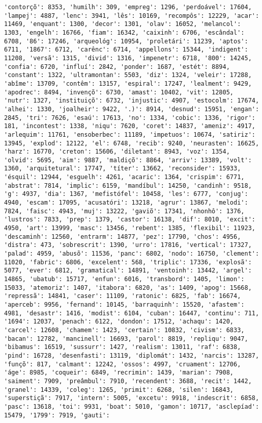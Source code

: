 \begin{Verbatim}[commandchars=\\\{\}]
'contorçõ': 8353, 'humilh': 309, 'empreg': 1296, 'perdoável': 17604, 'lampej': 4887, 'lenc': 3941, 'lês': 10169, 'recompôs': 12229, 'acar': 11469, 'enquant': 1300, 'decor': 1301, 'olav': 16052, 'melancol': 1303, 'engelh': 16766, 'fiam': 16342, 'caixinh': 6706, 'escândal': 6708, '86': 17246, 'arqueológ': 10954, 'proletári': 11239, 'aptos': 6711, '1867': 6712, 'carênc': 6714, 'appellons': 15344, 'indigent': 11208, 'versã': 1315, 'divid': 1316, 'impenetr': 6718, '800': 14245, 'confia': 6720, 'influí': 2842, 'ponder': 1687, 'estét': 8894, 'constant': 1322, 'ultramontan': 5503, 'diz': 1324, 'veleir': 17288, 'abîme': 13709, 'contêm': 13157, 'espiral': 17247, 'lealment': 9429, 'apodrec': 8494, 'invençõ': 6730, 'amast': 10402, 'vit': 12805, 'nutr': 1327, 'instituiçõ': 6732, 'injustic': 4907, 'estocolm': 17674, 'alhei': 1330, 'joalheir': 9422, '.)': 8914, 'desnud': 15951, 'engan': 2845, 'tri': 7626, 'esaú': 17613, 'no': 1334, 'cobic': 1336, 'rigor': 181, 'incontest': 1338, 'niqu': 7620, 'coret': 14837, 'ameniz': 4917, 'arlequim': 11761, 'ensoberbec': 11189, 'impetuos': 10674, 'satiriz': 13945, 'explod': 12122, 'el': 6748, 'recib': 9240, 'neurasten': 16625, 'harz': 16770, 'creton': 15606, 'diletant': 8943, 'voz': 1354, 'olvid': 5695, 'aim': 9887, 'maldiçõ': 8864, 'arriv': 13389, 'volt': 1360, 'arquitetural': 17747, 'títer': 13662, 'reconsider': 15933, 'ésquil': 12944, 'esguelh': 4261, 'acaric': 1364, 'crispim': 6771, 'abstrat': 7814, 'implic': 6159, 'mandíbul': 14250, 'candinh': 9518, 'g': 4937, 'dia': 1367, 'mefistófel': 10458, 'les': 6777, 'conjug': 4940, 'escam': 17095, 'acusatóri': 13218, 'agrur': 13867, 'melodi': 7824, 'faisc': 4943, 'muj': 13222, 'gaviõ': 17341, 'nhonhô': 1376, 'lustros': 7833, 'prep': 1379, 'castor': 16138, 'dif': 8010, 'excit': 4950, 'art': 13999, 'masc': 13456, 'rebent': 1385, 'flexibil': 11923, 'descaminh': 12560, 'entrarm': 14877, 'pez': 17790, 'chos': 4956, 'distra': 473, 'sobrescrit': 1390, 'urro': 17816, 'vertical': 17327, 'palad': 4959, 'abusõ': 11536, 'panc': 6802, 'nodo': 16750, 'clement': 11020, 'fabric': 6806, 'excelent': 568, 'triplic': 17336, 'explosã': 5077, 'ever': 6812, 'gramatical': 14891, 'ventoinh': 13442, 'argel': 14865, 'ubatub': 15717, 'enfun': 6016, 'transbord': 1405, 'limon': 15033, 'atemoriz': 1407, 'itabora': 6820, 'as': 1409, 'apog': 15668, 'repressã': 14841, 'caser': 11109, 'ratonic': 6825, 'fab': 16674, 'aperceb': 9956, 'fernand': 10145, 'barraquinh': 15520, 'afastem': 4981, 'desastr': 1416, 'modist': 6104, 'cuban': 16447, 'continu': 711, '1694': 12037, 'penach': 6122, 'dondon': 17512, 'achaqu': 1420, 'carcel': 12608, 'chamem': 1423, 'certain': 10832, 'civism': 6833, 'bacan': 12782, 'mancinell': 16693, 'parol': 8819, 'repliqu': 9047, 'bibamus': 16519, 'sussurr': 1427, 'realism': 13011, 'raf': 6838, 'pind': 16728, 'desenfasti': 13119, 'diplomát': 1432, 'narcis': 13287, 'funçõ': 817, 'calmant': 12242, 'ossos': 4997, 'cruament': 12706, 'áge': 8985, 'coqueir': 6849, 'recrimin': 1439, 'marian': 7908, 'saiment': 7909, 'preâmbul': 7910, 'recendent': 3688, 'recit': 1442, 'granel': 14339, 'coleg': 1265, 'primit': 6268, 'silen': 16843, 'superstiçã': 7917, 'intern': 5005, 'excetu': 9918, 'indescrit': 6858, 'pasc': 13618, 'toi': 9931, 'boat': 5010, 'gamon': 10717, 'asclepíad': 15479, '1799': 7919, 'gauti': 
\end{Verbatim}
